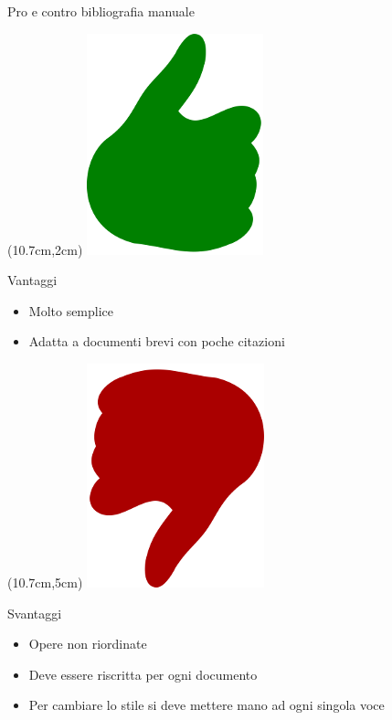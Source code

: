 \begin{frame}{Pro e contro bibliografia manuale}

\begin{textblock*}{2cm}(10.7cm,2cm)
      \includegraphics[scale=0.2]{res/images/pro}
\end{textblock*}

Vantaggi
\begin{itemize}
	\item Molto semplice
	\item Adatta a documenti brevi con poche citazioni
\end{itemize}

\vfill

\begin{textblock*}{2cm}(10.7cm,5cm)
      \includegraphics[scale=0.20]{res/images/contro}
\end{textblock*}

Svantaggi
\begin{itemize}
	\item Opere non riordinate
	\item Deve essere riscritta per ogni documento
	\item Per cambiare lo stile si deve mettere mano ad ogni singola voce
\end{itemize}

\end{frame}